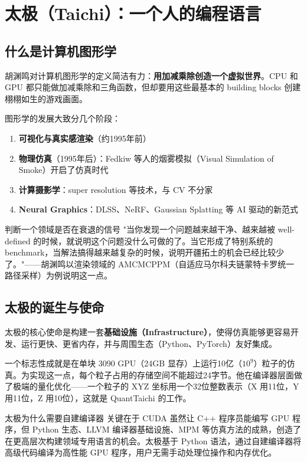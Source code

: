 \section{太极（Taichi）：一个人的编程语言}

\subsection{什么是计算机图形学}

胡渊鸣对计算机图形学的定义简洁有力：\textbf{用加减乘除创造一个虚拟世界}。CPU 和 GPU 都只能做加减乘除和三角函数，但却要用这些最基本的 building blocks 创建栩栩如生的游戏画面。

图形学的发展大致分几个阶段：

\begin{enumerate}
\item \textbf{可视化与真实感渲染}（约1995年前）
\item \textbf{物理仿真}（1995年后）：Fedkiw 等人的烟雾模拟（Visual Simulation of Smoke）开启了仿真时代
\item \textbf{计算摄影学}：super resolution 等技术，与 CV 不分家
\item \textbf{Neural Graphics}：DLSS、NeRF、Gaussian Splatting 等 AI 驱动的新范式
\end{enumerate}

\begin{knowledgebox}{判断一个领域是否在衰退的信号}
"当你发现一个问题越来越干净、越来越被 well-defined 的时候，就说明这个问题没什么可做的了。当它形成了特别系统的 benchmark，当解法搞得越来越复杂的时候，说明开疆拓土的机会已经比较少了。"——胡渊鸣以渲染领域的 AMCMCPPM（自适应马尔科夫链蒙特卡罗统一路径采样）为例说明这一点。
\end{knowledgebox}

\subsection{太极的诞生与使命}

太极的核心使命是构建一套\textbf{基础设施（Infrastructure）}，使得仿真能够更容易开发、运行更快、更省内存，并与周围生态（Python、PyTorch）友好集成。

一个标志性成就是在单块 3090 GPU（24GB 显存）上运行10亿（$10^9$）粒子的仿真。为实现这一点，每个粒子占用的存储空间不能超过24字节。他在编译器层面做了极端的量化优化——一个粒子的 XYZ 坐标用一个32位整数表示（X 用11位，Y 用11位，Z 用10位），这就是 QuantTaichi 的工作。

\begin{importantbox}{太极为什么需要自建编译器}
关键在于 CUDA 虽然让 C++ 程序员能编写 GPU 程序，但 Python 生态、LLVM 编译器基础设施、MPM 等仿真方法的成熟，创造了在更高层次构建领域专用语言的机会。太极基于 Python 语法，通过自建编译器将高级代码编译为高性能 GPU 程序，用户无需手动处理位操作和内存优化。
\end{importantbox}

